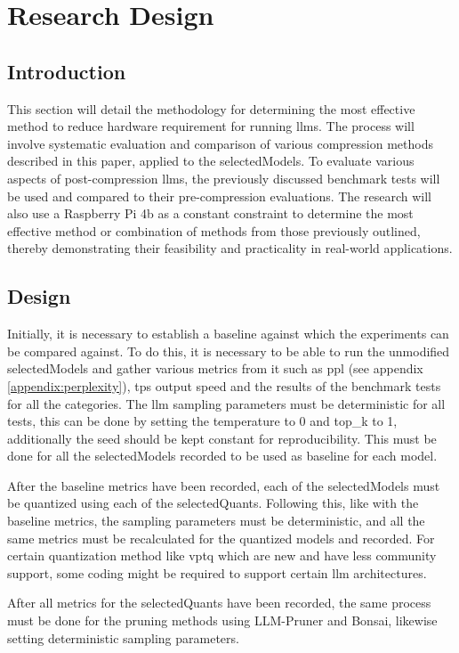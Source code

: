 \documentclass{ifacconf}
\begin{document}
	
	\section{Research Design}
	\subsection{Introduction}
	This section will detail the methodology for determining the most effective method to reduce hardware requirement for running \glspl{llm}. The process will involve systematic evaluation and comparison of various compression methods described in this paper, applied to the \gls{selectedModels}. To evaluate various aspects of post-compression \glspl{llm}, the previously discussed benchmark tests will be used and compared to their pre-compression evaluations. The research will also use a Raspberry Pi 4b as a constant constraint to determine the most effective method or combination of methods from those previously outlined, thereby demonstrating their feasibility and practicality in real-world applications.
	
	\subsection{Design}
	Initially, it is necessary to establish a baseline against which the experiments can be compared against. To do this, it is necessary to be able to run the unmodified \gls{selectedModels} and gather various metrics from it such as \gls{ppl} (see appendix \ref{appendix:perplexity}), \gls{tps} output speed and the results of the benchmark tests for all the categories. The \gls{llm} sampling parameters must be deterministic for all tests, this can be done by setting the temperature to 0 and top\_k to 1, additionally the seed should be kept constant for reproducibility. This must be done for all the \gls{selectedModels} recorded to be used as baseline for each model.
	
	After the baseline metrics have been recorded, each of the \gls{selectedModels} must be quantized using each of the \gls{selectedQuants}. Following this, like with the baseline metrics, the sampling parameters must be deterministic, and all the same metrics must be recalculated for the quantized models and recorded. For certain quantization method like \gls{vptq} which are new and have less community support, some coding might be required to support certain \gls{llm} architectures.
	
	After all metrics for the \gls{selectedQuants} have been recorded, the same process must be done for the pruning methods using LLM-Pruner and Bonsai, likewise setting deterministic sampling parameters.
	
\end{document}
